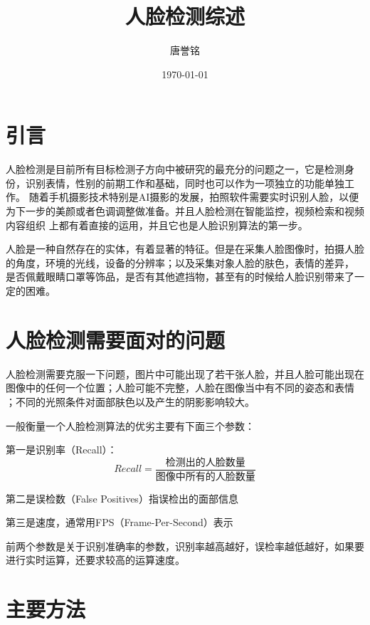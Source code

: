 \documentclass[UTF8]{ctexart}
\title{人脸检测综述}
\author{唐誉铭}
\date{\today}
\begin{document}
\maketitle
\section{引言}
人脸检测是目前所有目标检测子方向中被研究的最充分的问题之一，它是检测身份，识别表情，性别的前期工作和基础，同时也可以作为一项独立的功能单独工作。
随着手机摄影技术特别是AI摄影的发展，拍照软件需要实时识别人脸，以便为下一步的美颜或者色调调整做准备。并且人脸检测在智能监控，视频检索和视频内容组织
上都有着直接的运用，并且它也是人脸识别算法的第一步。

人脸是一种自然存在的实体，有着显著的特征。但是在采集人脸图像时，拍摄人脸的角度，环境的光线，设备的分辨率；以及采集对象人脸的肤色，表情的差异，
是否佩戴眼睛口罩等饰品，是否有其他遮挡物，甚至有的时候给人脸识别带来了一定的困难。
\section{人脸检测需要面对的问题}
人脸检测需要克服一下问题，图片中可能出现了若干张人脸，并且人脸可能出现在图像中的任何一个位置；人脸可能不完整，人脸在图像当中有不同的姿态和表情
；不同的光照条件对面部肤色以及产生的阴影影响较大。

一般衡量一个人脸检测算法的优劣主要有下面三个参数：

第一是识别率（Recall）：
\[Recall=\frac{\mbox{检测出的人脸数量}}{\mbox{图像中所有的人脸数量}}\]

第二是误检数（False Positives）指误检出的面部信息

第三是速度，通常用FPS（Frame-Per-Second）表示

前两个参数是关于识别准确率的参数，识别率越高越好，误检率越低越好，如果要进行实时运算，还要求较高的运算速度。
\section{主要方法}
\end{document}
